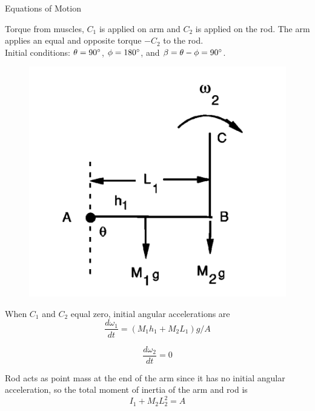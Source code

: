 \documentclass[tikz]{beamer}
\begin{document}
\begin{frame} {Equations of Motion}
	\only<4> {
		Torque from muscles, $C_1$ is applied on arm and $C_2$ is applied on the rod. The arm applies an equal and opposite torque $-C_2$ to the rod. \\
		Initial conditions: $\theta = 90\degree$, $\phi = 180\degree$, and $\beta = \theta - \phi = 90\degree$.

		\begin{figure}
			\centering
			\includegraphics[scale=0.4]{wristcock.png}
		\end{figure}
	}

	 {
		When $C_1$ and $C_2$ equal zero, initial angular accelerations are
		\begin{equation}
			\frac{d \omega_1}{dt} = (M_1 h_1 + M_2 L_1)g/A \tag{6}
		\end{equation}

		\begin{equation}
			\frac{d \omega_2}{dt} = 0 \tag{7}
		\end{equation}

		Rod acts as point mass at the end of the arm since it has no initial angular acceleration, so the total moment of inertia of the arm and rod is
		\begin{equation}
			I_1 +M_2 L_2^2 = A
		\end{equation}

	}


\end{frame}
\end{document}
